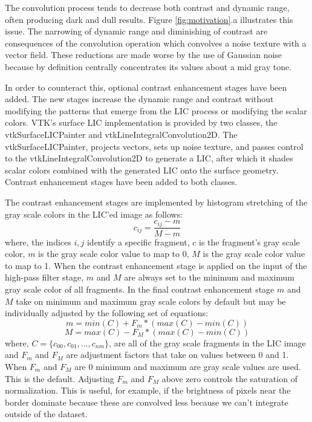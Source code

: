 \documentclass[a4paper,10pt]{article}
\begin{document}
\label{sec:contrast}
The convolution process tends to decrease both contrast and dynamic range, often producing dark and dull results. Figure \ref{fig:motivation}.a illustrates this issue. The narrowing of dynamic range and diminishing of contrast are consequences of the convolution operation which convolves a noise texture with a vector field. These reductions are made worse by the use of  Gaussian noise because by definition centrally concentrates its values about a mid gray tone.

In order to counteract this, optional contrast enhancement stages have been added. The new stages increase the dynamic range and contrast without modifying the patterns that emerge from the LIC process or modifying the scalar colors. VTK's surface LIC implementation is provided by two classes, the vtkSurfaceLICPainter and vtkLineIntegralConvolution2D. The vtkSurfaceLICPainter, projects vectors, sets up noise texture, and passes control to the vtkLineIntegralConvolution2D to generate a LIC, after which it shades scalar colors combined with the generated LIC onto the surface geometry. Contrast enhancement stages have been added to both classes.


The contrast enhancement stages are implemented by histogram stretching of the gray scale colors in the LIC'ed image as follows:
\begin{equation}
c_{ij} = \frac{c_{ij} - m}{M - m}
\end{equation}
where, the indices $i,j$ identify a specific fragment, $c$ is the fragment's gray scale color, $m$ is the gray scale color value to map to 0, $M$ is the gray scale color value to map to 1. When the contrast enhancement stage is applied on the input of the high-pass filter stage, $m$ and $M$ are always set to the minimum and maximum gray scale color of all fragments. In the final contrast enhancement stage $m$ and $M$ take on minimum and maximum gray scale colors by default but may be individually adjusted by the following set of equations:
\begin{equation}
m = min(C) + F_{m} * ( max(C) - min(C) )
\end{equation}
\begin{equation}
M = max(C) - F_{M} * ( max(C) - min(C) ) 
\end{equation}
where, $C = \{c_{00},c_{01},...,c_{nm}\}$, are all of the gray scale fragments in the LIC image and $F_m$ and $F_M$ are adjustment factors that take on values between 0 and 1. When $F_m$ and $F_M$ are 0 minimum and maximum are gray scale values are used. This is the default. Adjusting $F_m$ and $F_M$ above zero controls the saturation of normalization. This is useful, for example, if the brightness of pixels near the border dominate because these are convolved less because we can't integrate outside of the dataset.
\end{document}
